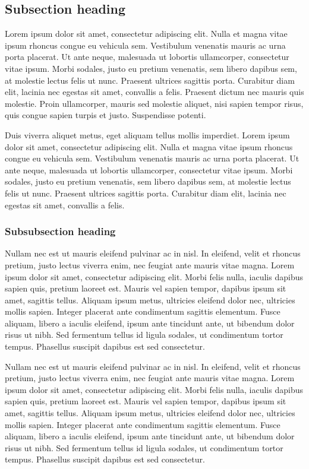 \documentclass[\pandocDocMode,longtable,noextraspace,floatsintext]{apa6}
\begin{document}
\hypertarget{subsection-heading}{%
\subsection{Subsection heading}\label{subsection-heading}}

Lorem ipsum dolor sit amet, consectetur adipiscing elit. Nulla et magna
vitae ipsum rhoncus congue eu vehicula sem. Vestibulum venenatis mauris
ac urna porta placerat. Ut ante neque, malesuada ut lobortis
ullamcorper, consectetur vitae ipsum. Morbi sodales, justo eu pretium
venenatis, sem libero dapibus sem, at molestie lectus felis ut nunc.
Praesent ultrices sagittis porta. Curabitur diam elit, lacinia nec
egestas sit amet, convallis a felis. Praesent dictum nec mauris quis
molestie. Proin ullamcorper, mauris sed molestie aliquet, nisi sapien
tempor risus, quis congue sapien turpis et justo. Suspendisse potenti.

Duis viverra aliquet metus, eget aliquam tellus mollis imperdiet. Lorem
ipsum dolor sit amet, consectetur adipiscing elit. Nulla et magna vitae
ipsum rhoncus congue eu vehicula sem. Vestibulum venenatis mauris ac
urna porta placerat. Ut ante neque, malesuada ut lobortis ullamcorper,
consectetur vitae ipsum. Morbi sodales, justo eu pretium venenatis, sem
libero dapibus sem, at molestie lectus felis ut nunc. Praesent ultrices
sagittis porta. Curabitur diam elit, lacinia nec egestas sit amet,
convallis a felis.

\hypertarget{subsubsection-heading}{%
\subsubsection{Subsubsection heading}\label{subsubsection-heading}}

Nullam nec est ut mauris eleifend pulvinar ac in nisl. In eleifend,
velit et rhoncus pretium, justo lectus viverra enim, nec feugiat ante
mauris vitae magna. Lorem ipsum dolor sit amet, consectetur adipiscing
elit. Morbi felis nulla, iaculis dapibus sapien quis, pretium laoreet
est. Mauris vel sapien tempor, dapibus ipsum sit amet, sagittis tellus.
Aliquam ipsum metus, ultricies eleifend dolor nec, ultricies mollis
sapien. Integer placerat ante condimentum sagittis elementum. Fusce
aliquam, libero a iaculis eleifend, ipsum ante tincidunt ante, ut
bibendum dolor risus ut nibh. Sed fermentum tellus id ligula sodales, ut
condimentum tortor tempus. Phasellus suscipit dapibus est sed
consectetur.

Nullam nec est ut mauris eleifend pulvinar ac in nisl. In eleifend,
velit et rhoncus pretium, justo lectus viverra enim, nec feugiat ante
mauris vitae magna. Lorem ipsum dolor sit amet, consectetur adipiscing
elit. Morbi felis nulla, iaculis dapibus sapien quis, pretium laoreet
est. Mauris vel sapien tempor, dapibus ipsum sit amet, sagittis tellus.
Aliquam ipsum metus, ultricies eleifend dolor nec, ultricies mollis
sapien. Integer placerat ante condimentum sagittis elementum. Fusce
aliquam, libero a iaculis eleifend, ipsum ante tincidunt ante, ut
bibendum dolor risus ut nibh. Sed fermentum tellus id ligula sodales, ut
condimentum tortor tempus. Phasellus suscipit dapibus est sed
consectetur.
\end{document}
